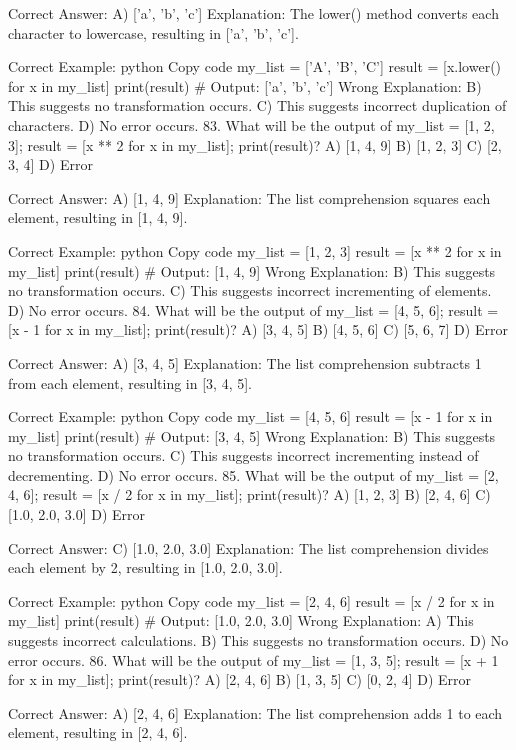 Correct Answer: A) ['a', 'b', 'c']
Explanation: The lower() method converts each character to lowercase, resulting in ['a', 'b', 'c'].

Correct Example:
python
Copy code
my_list = ['A', 'B', 'C']
result = [x.lower() for x in my_list]
print(result)  # Output: ['a', 'b', 'c']
Wrong Explanation:
B) This suggests no transformation occurs.
C) This suggests incorrect duplication of characters.
D) No error occurs.
83. What will be the output of my_list = [1, 2, 3]; result = [x ** 2 for x in my_list]; print(result)?
A) [1, 4, 9]
B) [1, 2, 3]
C) [2, 3, 4]
D) Error

Correct Answer: A) [1, 4, 9]
Explanation: The list comprehension squares each element, resulting in [1, 4, 9].

Correct Example:
python
Copy code
my_list = [1, 2, 3]
result = [x ** 2 for x in my_list]
print(result)  # Output: [1, 4, 9]
Wrong Explanation:
B) This suggests no transformation occurs.
C) This suggests incorrect incrementing of elements.
D) No error occurs.
84. What will be the output of my_list = [4, 5, 6]; result = [x - 1 for x in my_list]; print(result)?
A) [3, 4, 5]
B) [4, 5, 6]
C) [5, 6, 7]
D) Error

Correct Answer: A) [3, 4, 5]
Explanation: The list comprehension subtracts 1 from each element, resulting in [3, 4, 5].

Correct Example:
python
Copy code
my_list = [4, 5, 6]
result = [x - 1 for x in my_list]
print(result)  # Output: [3, 4, 5]
Wrong Explanation:
B) This suggests no transformation occurs.
C) This suggests incorrect incrementing instead of decrementing.
D) No error occurs.
85. What will be the output of my_list = [2, 4, 6]; result = [x / 2 for x in my_list]; print(result)?
A) [1, 2, 3]
B) [2, 4, 6]
C) [1.0, 2.0, 3.0]
D) Error

Correct Answer: C) [1.0, 2.0, 3.0]
Explanation: The list comprehension divides each element by 2, resulting in [1.0, 2.0, 3.0].

Correct Example:
python
Copy code
my_list = [2, 4, 6]
result = [x / 2 for x in my_list]
print(result)  # Output: [1.0, 2.0, 3.0]
Wrong Explanation:
A) This suggests incorrect calculations.
B) This suggests no transformation occurs.
D) No error occurs.
86. What will be the output of my_list = [1, 3, 5]; result = [x + 1 for x in my_list]; print(result)?
A) [2, 4, 6]
B) [1, 3, 5]
C) [0, 2, 4]
D) Error

Correct Answer: A) [2, 4, 6]
Explanation: The list comprehension adds 1 to each element, resulting in [2, 4, 6].

